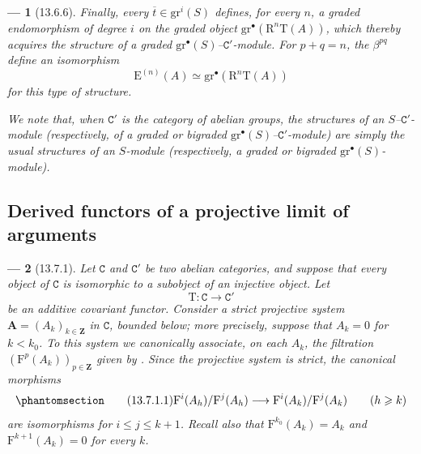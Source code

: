 \documentclass[oneside]{amsart}
\theoremstyle{ega-env-style}
\newtheorem*{env}{---}
\theoremstyle{ega-thm-env-style}
\theoremstyle{ega-defn-env-style}
\def\bb{\mathbf}                    %
\def\cat{\mathtt}                   %
\def\leq{\leqslant}                 %
\def\geq{\geqslant}                 %
\def\RR{\mathrm{R}}                 %
\def\isoto{\simeq} %
\let\EGAOriginalLabel\label
\renewcommand{\label}[1]{\phantomsection\EGAOriginalLabel{#1}}
\begin{document}
\begin{env}[13.6.6]
Finally, every $\overline{t}\in\mathrm{gr}^i(S)$ defines, for every
$n$, a graded endomorphism of degree $i$ on the graded object
$\mathrm{gr}^\bullet(\RR^n\mathrm{T}(A))$, which thereby acquires the
structure of a graded
$\mathrm{gr}^\bullet(S)$--$\cat{C}'$-module.
For $p+q=n$, the $\beta^{pq}$ define an isomorphism
\[
  \mathrm{E}^{(n)}(A)
  \isoto
  \mathrm{gr}^\bullet(\RR^n\mathrm{T}(A))
\]
for this type of structure.

We note that, when $\cat{C}'$ is the category of abelian groups, the
structures of an $S$--$\cat{C}'$-module (respectively, of a graded or
bigraded $\mathrm{gr}^\bullet(S)$--$\cat{C}'$-module) are simply the
usual structures of an $S$-module (respectively, a graded or
bigraded $\mathrm{gr}^\bullet(S)$-module).
\end{env}

\subsection{Derived functors of a projective limit of arguments}
\label{subsection:0.13.7}
\label{0.13.7}

\begin{env}[13.7.1]
\label{0.13.7.1}
Let $\cat{C}$ and $\cat{C}'$ be two abelian categories, and suppose
that every object of $\cat{C}$ is isomorphic to a subobject of an
injective object.
Let
\[
  \mathrm{T}:\cat{C}\longrightarrow\cat{C}'
\]
be an additive covariant functor.
Consider a strict projective system
$\bb{A}=(A_k)_{k\in\bb{Z}}$ in $\cat{C}$, bounded below; more
precisely, suppose that $A_k=0$ for $k<k_0$.
To this system we canonically associate, on each $A_k$, the
filtration $(\mathrm{F}^p(A_k))_{p\in\bb{Z}}$ given by
.
Since the projective system is strict, the canonical morphisms
\begin{equation}
\label{0.13.7.1.1}
\tag{13.7.1.1}
  \mathrm{F}^i(A_h)/\mathrm{F}^j(A_h)
  \longrightarrow
  \mathrm{F}^i(A_k)/\mathrm{F}^j(A_k)
  \qquad(h\geq k)
\end{equation}
are isomorphisms for $i\leq j\leq k+1$.
Recall also that
$\mathrm{F}^{k_0}(A_k)=A_k$ and
$\mathrm{F}^{k+1}(A_k)=0$ for every $k$.
\end{env}
\end{document}
